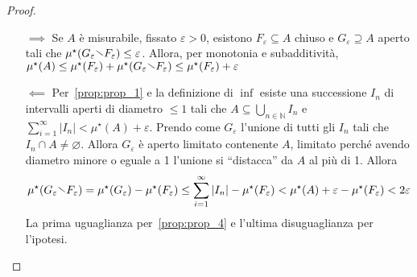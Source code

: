 \begin{proof}\( \)
\begin{itemize}
    \item[\(\implies \)] Se \(A\) è misurabile, fissato \( \varepsilon > 0\),
        esistono \(F_{\varepsilon} \subseteq A \) chiuso e \(G_{\varepsilon}
        \supseteq A \) aperto tali che \(\mu^\star(G_{\varepsilon} \sminus
        F_{\varepsilon}) \le \varepsilon\). Allora, per monotonia e subadditività, \(\mu^\star(A) \le
        \mu^\star(F_\varepsilon) + \mu^\star(G_\varepsilon \sminus
        F_\varepsilon) \le \mu^\star(F_\varepsilon) + \varepsilon\) 
    \item[\(\impliedby \)] Per~\ref{prop:prop_1} e la definizione di \(\inf\)
        esiste una successione \(I_{n}\) di intervalli aperti di diametro \(\le
        1\) tali che \(A \subseteq
        \bigcup_{n \in \mathbb{N}} I_{n}  \) e \(\sum_{i=1}^{\infty} |I_{n}| <
        \mu^\star(A) + \varepsilon \). Prendo come \(G_\varepsilon\) l'unione di
        tutti gli \(I_{n}\) tali che \(I_{n} \cap A \neq \varnothing\). Allora
        \(G_\varepsilon\) è aperto limitato contenente \(A\), limitato perché
        avendo diametro minore o eguale a 1 l'unione si ``distacca'' da \(A\) al
        più di 1. Allora \[\mu^\star(G_\varepsilon \sminus F_\varepsilon) =
        \mu^\star(G_\varepsilon) - \mu^\star(F_\varepsilon) \le
        \sum_{i=1}^{\infty} |I_n| - \mu^\star(F_\varepsilon) < \mu^\star(A) +
        \varepsilon - \mu^\star(F_\varepsilon) < 2\varepsilon \] 
        La prima uguaglianza per~\ref{prop:prop_4} e l'ultima disuguaglianza per
        l'ipotesi.
\end{itemize}
\end{proof}

